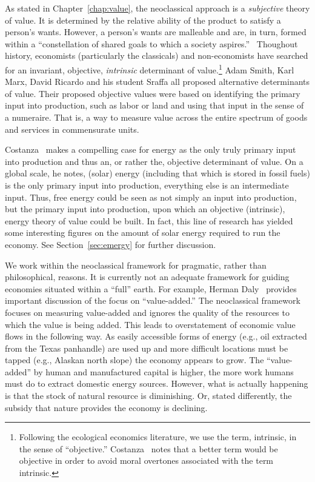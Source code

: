 As stated in Chapter~\ref{chap:value}, the neoclassical approach 
is a \emph{subjective} theory of value. 
It is determined by the relative ability of the product to satisfy a person’s wants. 
However, a person’s wants are malleable and are, in turn, formed within a 
``constellation of shared goals to which a society aspires.''~\cite{Costanza:2004we}
Thoughout history, economists (particularly the classicals) 
and non-economists have searched for an invariant, objective, 
\emph{intrinsic} determinant of value.\footnote{Following the ecological economics literature, 
we use the term, intrinsic, in the sense of ``objective.'' Costanza~\cite{Costanza:2004we} 
notes that a better term would be objective in order to avoid moral overtones associated 
with the term intrinsic.} 
Adam Smith, Karl Marx, David Ricardo and his student Sraffa all proposed 
alternative determinants of value.  
Their proposed objective values were based on identifying the primary input into production,
such as labor or land and using that input in the sense of a numeraire. 
That is, a way to measure value across the entire spectrum 
of goods and services in commensurate units.

Costanza~\cite{Costanza:2004we} makes a compelling case for energy 
as the only truly primary input into production 
and thus an, or rather the, objective determinant of value. 
On a global scale, he notes, (solar) energy 
(including that which is stored in fossil fuels) is the only primary input into production, 
everything else is an intermediate input. 
Thus, free energy could be seen as not simply an input into production, 
but the primary input into production, upon which an objective (intrinsic), 
energy theory of value could be built. 
In fact, this line of research has yielded some interesting figures on the amount 
of solar energy required to run the economy. 
See Section~\ref{sec:emergy} for further discussion.

We work within the neoclassical framework for pragmatic, rather than philosophical, reasons. 
It is currently not an adequate 
framework for guiding economies situated within a ``full'' earth. For example, 
Herman Daly~\cite{daly1995} provides important discussion 
of the focus on ``value-added.'' %
The neoclassical framework focuses on measuring value-added 
and ignores the quality of the resources to which the value is being added. 
This leads to overstatement of economic value flows in the following way. 
As easily accessible forms of energy (e.g.,  oil extracted from the Texas panhandle) 
are used up and more difficult locations must be tapped (e.g., Alaskan north slope) 
the economy appears to grow.
The ``value-added'' by human and manufactured capital is higher, 
the more work humans must do to extract domestic energy sources. 
However, what is actually happening is that the stock  of  natural resource is diminishing. 
Or, stated differently, the subsidy that nature provides the economy is declining.

